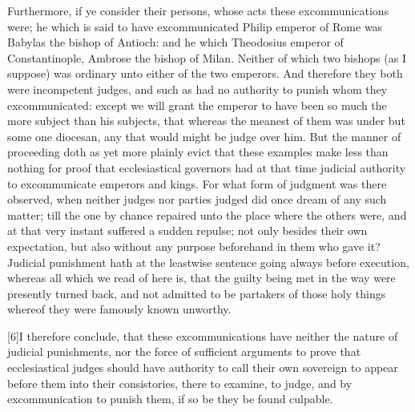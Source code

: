 Furthermore, if ye consider their persons, whose acts these excommunications were; he which is said to have excommunicated Philip emperor of Rome was Babylas the bishop of Antioch: and he which Theodosius emperor of Constantinople, Ambrose the bishop of Milan. Neither of which two bishops  (as I suppose) was ordinary unto either of the two emperors.  And therefore they both were incompetent judges, and such as had no authority to punish whom they excommunicated: except we will grant the emperor to have been so much the more subject than his subjects, that whereas the meanest of them was under but some one diocesan, any that would might be judge over him. But the manner of proceeding doth as yet more plainly evict that these examples make less than nothing for proof that ecclesiastical governors had at that time judicial authority to excommunicate emperors and kings. For what form of judgment was there observed, when neither judges nor parties judged did once dream of any such matter; till the one by chance repaired unto the place where the others were, and at that very instant suffered a sudden repulse; not only besides their own expectation, but also without any purpose beforehand in them who gave it? Judicial punishment hath at the leastwise sentence going always before execution, whereas all which we read of here is, that the guilty being met in the way were presently turned back, and not admitted to be partakers of those holy things whereof they were famously known unworthy.

[6]I therefore conclude, that these excommunications have neither the nature of judicial punishments, nor the force of sufficient arguments to prove that ecclesiastical judges should have authority to call their own sovereign to appear before them into their consistories, there to examine, to judge, and by excommunication to punish them, if so be they be found culpable.

